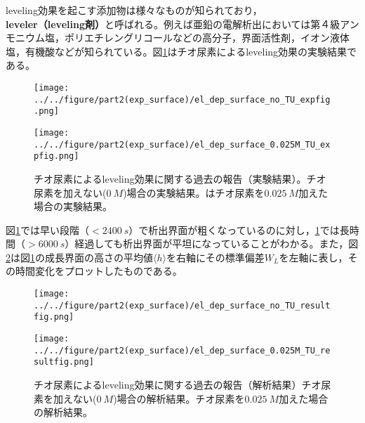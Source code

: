 \documentclass[autodetect-engine,dvi=dvipdfmx,a4paper,ja=standard,oneside,openany,11pt]{bxjsbook}
\begin{document}
leveling効果を起こす添加物は様々なものが知られており，\textbf{leveler（leveling剤）}と呼ばれる。例えば亜鉛の電解析出においては第４級アンモニウム塩，ポリエチレングリコールなどの高分子，界面活性剤，イオン液体塩，有機酸\cite{sorour2017review}などが知られている。図\ref{fig:leveling}はチオ尿素によるleveling効果の実験結果である\cite{schilardi1998evolution}。

\begin{figure}[htbp]
  \begin{minipage}
    {0.5\textwidth}
    \subcaption{}
    \centering
    \texttt{[image: ../../figure/part2(exp\_surface)/el\_dep\_surface\_no\_TU\_expfig.png]}
    \label{fig:no_leveling_effect}
  \end{minipage}
  \begin{minipage}
    {0.5\textwidth}
    \subcaption{}
    \centering
    \texttt{[image: ../../figure/part2(exp\_surface)/el\_dep\_surface\_0.025M\_TU\_expfig.png]}
    \label{fig:leveling_effect}
  \end{minipage}
  \caption{チオ尿素によるleveling効果に関する過去の報告（実験結果）\cite{schilardi1998evolution}。チオ尿素を加えない($\SI{0}{M}$)場合の実験結果。はチオ尿素を$\SI{0.025}{M}$加えた場合の実験結果。}
  \label{fig:leveling}
\end{figure}

図\ref{fig:leveling}では早い段階（$<\SI{2400}{s}$）で析出界面が粗くなっているのに対し，\ref{fig:leveling}では長時間（$>\SI{6000}{s}$）経過しても析出界面が平坦になっていることがわかる。また，図\ref{fig:leveling_result}は図\ref{fig:leveling}の成長界面の高さの平均値$\langle h\rangle$を右軸にその標準偏差$W_L$を左軸に表し，その時間変化をプロットしたものである。

\begin{figure}[htbp]
  \begin{minipage}
    {0.5\textwidth}
    \subcaption{}
    \centering
    \texttt{[image: ../../figure/part2(exp\_surface)/el\_dep\_surface\_no\_TU\_resultfig.png]}
    \label{fig:no_leveling_effect_result}
  \end{minipage}
  \begin{minipage}
    {0.5\textwidth}
    \subcaption{}
    \centering
    \texttt{[image: ../../figure/part2(exp\_surface)/el\_dep\_surface\_0.025M\_TU\_resultfig.png]}
    \label{fig:leveling_effect_result}
  \end{minipage}
  \caption{チオ尿素によるleveling効果に関する過去の報告（解析結果）\cite{schilardi1998evolution}チオ尿素を加えない($\SI{0}{M}$)場合の解析結果。チオ尿素を$\SI{0.025}{M}$加えた場合の解析結果。}
  \label{fig:leveling_result}
\end{figure}
\end{document}
